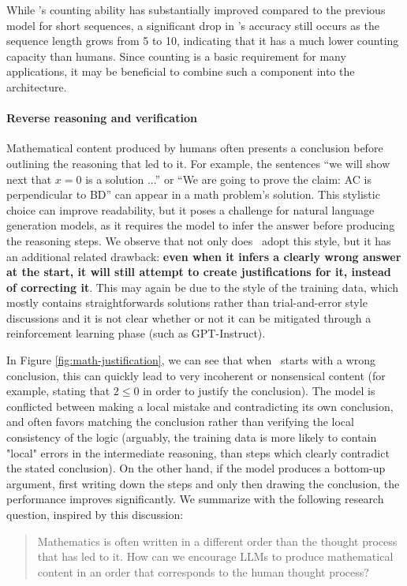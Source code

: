 While \DV's counting ability has substantially improved compared to the previous model for short sequences, a significant drop in \DV's accuracy still occurs as the sequence length grows from 5 to 10, indicating that it has a much lower counting capacity than humans. Since counting is a basic requirement for many applications, it may be beneficial to combine such a component into the architecture.

\paragraph{Reverse reasoning and verification}

Mathematical content produced by humans often presents a conclusion before outlining the reasoning that led to it. For example, the sentences ``we will show next that $x = 0$ is a solution ...'' or ``We are going to prove the claim: AC is perpendicular to BD'' can appear in a math problem's solution. This stylistic choice can improve readability, but it poses a challenge for natural language generation models, as it requires the model to infer the answer before producing the reasoning steps. We observe that not only does \DV \ adopt this style, but it has an additional related drawback: \textbf{even when it infers a clearly wrong answer at the start, it will still attempt to create justifications for it, instead of correcting it}. This may again be due to the style of the training data, which mostly contains straightforwards solutions rather than trial-and-error style discussions and it is not clear whether or not it can be mitigated through a reinforcement learning phase (such as GPT-Instruct).

In Figure \ref{fig:math-justification}, we can see that when \DV \ starts with a wrong conclusion, this can quickly lead to very incoherent or nonsensical content (for example, stating that $2 \leq 0$ in order to justify the conclusion). The model is conflicted between making a local mistake and contradicting its own conclusion, and often favors matching the conclusion rather than verifying the local consistency of the logic (arguably, the training data is more likely to contain "local" errors in the intermediate reasoning, than steps which clearly contradict the stated conclusion). 
 On the other hand, if the model produces a bottom-up argument, first writing down the steps and only then drawing the conclusion, the performance improves significantly. We summarize with the following research question, inspired by this discussion:
\begin{quote}
Mathematics is often written in a different order than the thought process that has led to it. How can we encourage LLMs to produce mathematical content in an order that corresponds to the human thought process?
\end{quote}

